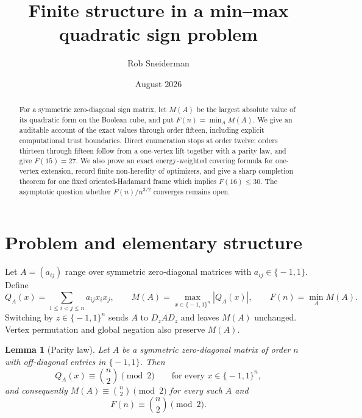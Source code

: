 \documentclass[11pt]{article}
\title{Finite structure in a min--max quadratic sign problem}
\author{Rob Sneiderman}
\date{August 2026}
\newcommand{\eps}{\{\!-1,1\!\}}
\newtheorem{lemma}[theorem]{Lemma}
\theoremstyle{remark}
\begin{document}
\maketitle

\begin{abstract}
For a symmetric zero-diagonal sign matrix, let $M(A)$ be the largest absolute
value of its quadratic form on the Boolean cube, and put
$F(n)=\min_A M(A)$.  We give an auditable account of the exact values through
order fifteen, including explicit computational trust boundaries.  Direct
enumeration stops at order twelve; orders thirteen through fifteen follow from
a one-vertex lift together with a parity law, and give $F(15)=27$.  We also
prove an exact energy-weighted covering formula for one-vertex extension,
record finite non-heredity of optimizers, and give a sharp completion theorem
for one fixed oriented-Hadamard frame which implies $F(16)\le30$.
The asymptotic question whether $F(n)/n^{3/2}$ converges remains open.
\end{abstract}

\begin{center}
\end{center}

\section{Problem and elementary structure}

Let $A=(a_{ij})$ range over symmetric zero-diagonal matrices with
$a_{ij}\in\eps$.  Define
\[
 Q_A(x)=\sum_{1\le i<j\le n}a_{ij}x_ix_j,
 \qquad M(A)=\max_{x\in\eps^n}|Q_A(x)|,
 \qquad F(n)=\min_A M(A).
\]
Switching by $z\in\eps^n$ sends $A$ to $D_zAD_z$ and leaves $M(A)$
unchanged.  Vertex permutation and global negation also preserve $M(A)$.

\begin{lemma}[Parity law]\label{lem:parity}
Let $A$ be a symmetric zero-diagonal matrix of order $n$ with off-diagonal
entries in $\eps$.  Then
\[
 Q_A(x)\equiv\binom n2\pmod 2\qquad\text{for every }x\in\eps^n,
\]
and consequently $M(A)\equiv\binom n2\pmod 2$ for every such $A$ and
\[
 F(n)\equiv\binom n2\pmod2 .
\]
\end{lemma}
\end{document}

